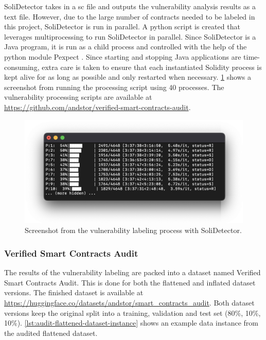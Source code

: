 
SoliDetector takes in a \acrshort{sc} file and outputs the vulnerability analysis results as a text file. However, due to the large number of contracts needed to be labeled in this project, SoliDetector is run in parallel. A python script is created that leverages multiprocessing to run SoliDetector in parallel. Since SoliDetector is a Java program, it is run as a child process and controlled with the help of the python module Pexpect \cite{pexpect}. Since starting and stopping Java applications are time-consuming, extra care is taken to ensure that each instantiated Solidity process is kept alive for as long as possible and only restarted when necessary. \cref{fig:solidetector-vulnerability-labeling} shows a screenshot from running the processing script using 40 processes. The vulnerability processing scripts are available at \url{https://github.com/andstor/verified-smart-contracts-audit}.

\begin{figure}
    \centering
    \includegraphics[width=\textwidth]{figures/solidetector-run.png}
    \caption{Screenshot from the vulnerability labeling process with SoliDetector.}
    \label{fig:solidetector-vulnerability-labeling}
\end{figure}

\subsubsection{Verified Smart Contracts Audit}
\label{sec:verified-smart-contracts-audit}
The results of the vulnerability labeling are packed into a dataset named Verified Smart Contracts Audit. This is done for both the flattened and inflated dataset versions. The finished dataset is available at \url{https://huggingface.co/datasets/andstor/smart_contracts_audit}. Both dataset versions keep the original split into a training, validation and test set (80\%, 10\%, 10\%). \cref{lst:audit-flattened-dataset-instance} shows an example data instance from the audited flattened dataset.


